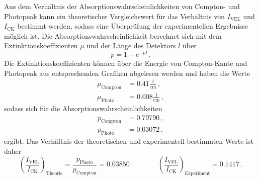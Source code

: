 Aus dem Verhältnis der Absorptionswahrscheinlichkeiten von Compton- und Photopeak 
kann ein theoretischer Vergleichswert für das Verhältnis von $I_\text{VEL}$ und $I_\text{CK}$
bestimmt werden, sodass eine Überprüfung der experimentellen Ergebnisse möglich ist. 
Die Absorptionswahrscheinlichkeit berechnet sich mit dem Extinktionskoeffizienten $\mu$ und der Länge des 
Detektors $l$ über 
\begin{equation}
    p = 1 - \text{e}^{- \mu l} \, .
\end{equation}
Die Extinktionskoeffizienten können über die Energie von Compton-Kante und Photopeak aus entsprechenden Grafiken abgelesen werden und haben 
die Werte 
\begin{align*}
    \mu_\text{Compton}  &= 0.41 \frac{1}{\text{cm}} \, ,\\
    \mu_\text{Photo}  &= 0.008 \frac{1}{\text{cm}} \, ,
\end{align*}
sodass sich für die Absorptionswahrscheinlichkeiten
\begin{align*}
    p_\text{Compton}  &= 0.79790 \, ,\\
    p_\text{Photo}  &= 0.03072 \, .
\end{align*}
ergibt.
Das Verhältnis der theoretischen und experimentell bestimmten Werte ist daher 
\begin{equation}
    \left(\frac{I_\text{VEL}}{I_\text{CK}}\right)_\text{Theorie} = \frac{p_\text{Photo}}{p_\text{Compton}} = 0.03850 \qquad \qquad \left(\frac{I_\text{VEL}}{I_\text{CK}}\right)_\text{Experiment} = 0.1417 \, . 
\end{equation}

